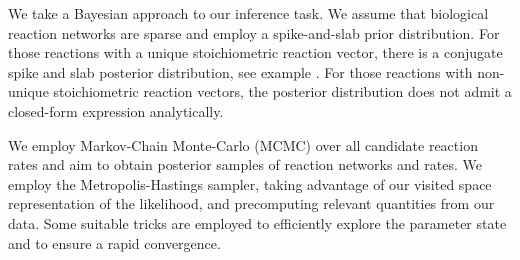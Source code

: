 \documentclass[pdflatex,sn-mathphys-num]{sn-jnl}%
\theoremstyle{thmstyleone}%
\theoremstyle{thmstyletwo}%
\theoremstyle{thmstylethree}%
\begin{document}



We take a Bayesian approach to our inference task. We assume that biological reaction networks are sparse and employ a spike-and-slab prior distribution. For those reactions with a unique stoichiometric reaction vector, there is a conjugate spike and slab posterior distribution, see example . For those reactions with non-unique stoichiometric reaction vectors, the posterior distribution does not admit a closed-form expression analytically.



We employ Markov-Chain Monte-Carlo (MCMC) over all candidate reaction rates and aim to obtain posterior samples of reaction networks and rates. We employ the Metropolis-Hastings sampler, taking advantage of our visited space representation of the likelihood, and precomputing relevant quantities from our data. Some suitable tricks are employed to efficiently explore the parameter state and to ensure a rapid convergence. 



 
\end{document}
